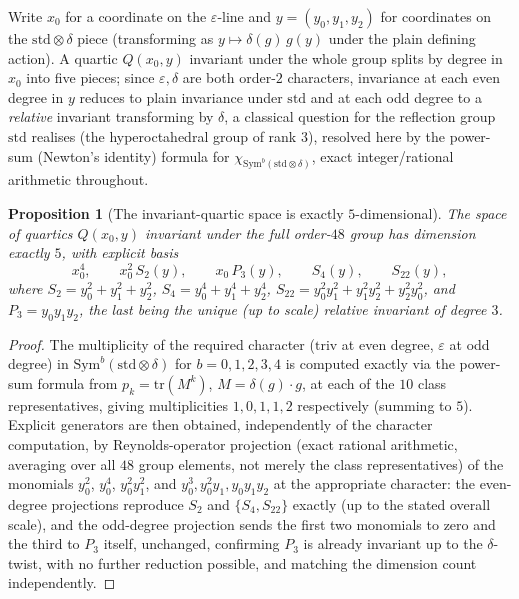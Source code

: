 \documentclass[11pt,reqno]{amsart}
\renewcommand{\_}{\origunderscore\allowbreak}
\numberwithin{equation}{section}
\theoremstyle{plain}
\newtheorem{prop}[thm]{Proposition}
\theoremstyle{definition}
\theoremstyle{remark}
\begin{document}
Write $x_0$ for a coordinate on the $\varepsilon$-line and
$y=(y_0,y_1,y_2)$ for coordinates on the $\mathrm{std}\otimes\delta$
piece (transforming as $y\mapsto\delta(g)\,g(y)$ under the plain defining
action). A quartic $Q(x_0,y)$ invariant under the whole group splits by
degree in $x_0$ into five pieces; since $\varepsilon,\delta$ are both
order-$2$ characters, invariance at each even degree in $y$ reduces to
plain invariance under $\mathrm{std}$ and at each odd degree to a
\emph{relative} invariant transforming by $\delta$, a classical
question for the reflection group $\mathrm{std}$ realises (the
hyperoctahedral group of rank $3$), resolved here by the power-sum
(Newton's identity) formula for $\chi_{\mathrm{Sym}^b(\mathrm{std}\otimes\delta)}$,
exact integer/rational arithmetic throughout.

\begin{prop}[The invariant-quartic space is exactly $5$-dimensional]\label{prop:a18-invariant-dim}
The space of quartics $Q(x_0,y)$ invariant under the full order-$48$
group has dimension exactly $5$, with explicit basis
\[
  x_0^4,\qquad x_0^2\,S_2(y),\qquad x_0\,P_3(y),\qquad S_4(y),\qquad S_{22}(y),
\]
where $S_2=y_0^2+y_1^2+y_2^2$, $S_4=y_0^4+y_1^4+y_2^4$,
$S_{22}=y_0^2y_1^2+y_1^2y_2^2+y_2^2y_0^2$, and $P_3=y_0y_1y_2$, the
last being the unique (up to scale) relative invariant of degree $3$.
\end{prop}

\begin{proof}
The multiplicity of the required character ($\mathrm{triv}$ at even
degree, $\varepsilon$ at odd degree) in $\mathrm{Sym}^b(\mathrm{std}\otimes\delta)$
for $b=0,1,2,3,4$ is computed exactly via the power-sum formula from
$p_k=\mathrm{tr}(M^k)$, $M=\delta(g)\cdot g$, at each of the $10$ class
representatives, giving multiplicities $1,0,1,1,2$ respectively (summing
to $5$). Explicit generators are then obtained, independently of the
character computation, by Reynolds-operator projection (exact rational
arithmetic, averaging over all $48$ group elements, not merely the class
representatives) of the monomials $y_0^2$, $y_0^4$, $y_0^2y_1^2$, and
$y_0^3,y_0^2y_1,y_0y_1y_2$ at the appropriate character: the even-degree
projections reproduce $S_2$ and $\{S_4,S_{22}\}$ exactly (up to the
stated overall scale), and the odd-degree projection sends the first two
monomials to zero and the third to $P_3$ itself, unchanged, confirming
$P_3$ is already invariant up to the $\delta$-twist, with no further
reduction possible, and matching the dimension count independently.
\end{proof}
\end{document}
